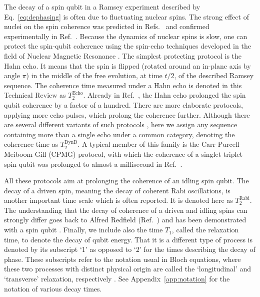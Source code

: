 \documentclass[aps, prx, showpacs, twocolumn, superscriptaddress, notitlepage, longbibliography, floatfix, nofootinbib]{revtex4-2}
\newcommand{\TRabi}{T_2^\mathrm{Rabi}}
\newcommand{\TEcho}{T_2^\mathrm{Echo}}
\newcommand{\TDynD}{T_2^\mathrm{DynD}}
\begin{document}
The decay of a spin qubit in a Ramsey experiment described by Eq.~\eqref{eq:dephasing} is often due to fluctuating nuclear spins. The strong effect of nuclei on the spin coherence was predicted in Refs.~\cite{khaetskii_electron_2002, merkulov_electron_2002} and confirmed experimentally in Ref.~\cite{petta_coherent_2005}. Because the dynamics of nuclear spins is slow, one can protect the spin-qubit coherence using the spin-echo techniques developed in the field of Nuclear Magnetic Resonance \cite{slichter_principles_1996}. The simplest protecting protocol is the Hahn echo\cite{hahn_spin_1950}. It means that the spin is flipped (rotated around an in-plane axis by angle $\pi$) in the middle of the free evolution, at time $t/2$, of the described Ramsey sequence. The coherence time measured under a Hahn echo is denoted in this Technical Review as $ \TEcho$. Already in Ref.~\cite{petta_coherent_2005}, the Hahn echo prolonged the spin qubit coherence by a factor of a hundred. There are more elaborate protocols, applying more echo pulses, which prolong the coherence further. Although there are several different variants of such protocols \cite{alvarez_performance_2010}, here we assign any sequence containing more than a single echo under a common category, denoting the coherence time as $ \TDynD$. A typical member of this family is the Carr-Purcell-Meiboom-Gill (CPMG) protocol, with which the coherence of a singlet-triplet spin-qubit was prolonged to almost a millisecond in Ref.~\cite{malinowski_notch_2016}. 

All these protocols aim at prolonging the coherence of an idling spin qubit. The decay of a driven spin, meaning the decay of coherent Rabi oscillations, is another important time scale which is often reported. It is denoted here as $ \TRabi$. The understanding that the decay of coherence of a driven and idling spins can strongly differ goes back to Alfred Redfield (Ref.~\cite{redfield_nuclear_1955}) and has been demonstrated with a spin qubit \cite{laucht_dressed_2016}. Finally, we include also the time $T_1$, called the relaxation time, to denote the decay of qubit energy. That it is a different type of process is denoted by its subscript `1' as opposed to `2' for the times describing the decay of phase. These subscripts refer to the notation usual in Bloch equations, where these two processes with distinct physical origin are called the `longitudinal' and `transverse' relaxation, respectively \cite{bloch_nuclear_1946}. See Appendix~\ref{app:notation} for the notation of various decay times. 
\end{document}
